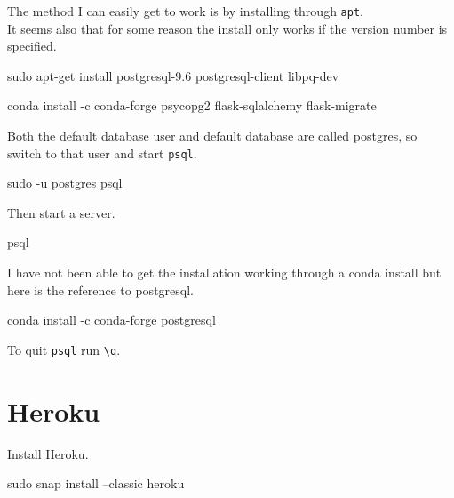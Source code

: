 \documentclass[]{book}
\newenvironment{Shaded}{\begin{snugshade}}{\end{snugshade}}
\newcommand{\FunctionTok}[1]{\textcolor[rgb]{0.00,0.00,0.00}{#1}}
\newcommand{\ExtensionTok}[1]{#1}
\newcommand{\NormalTok}[1]{#1}
\begin{document}
The method I can easily get to work is by installing through
\texttt{apt}.\\
It seems also that for some reason the install only works if the version
number is specified.

\begin{Shaded}
\begin{Highlighting}[]
\FunctionTok{sudo}\NormalTok{ apt-get install postgresql-9.6 postgresql-client libpq-dev}
\end{Highlighting}
\end{Shaded}

conda install -c conda-forge psycopg2 flask-sqlalchemy flask-migrate

Both the default database user and default database are called postgres,
so switch to that user and start \texttt{psql}.

\begin{Shaded}
\begin{Highlighting}[]
\FunctionTok{sudo}\NormalTok{ -u postgres psql}
\end{Highlighting}
\end{Shaded}

Then start a server.

\begin{Shaded}
\begin{Highlighting}[]
\ExtensionTok{psql}
\end{Highlighting}
\end{Shaded}

I have not been able to get the installation working through a conda
install but here is the reference to postgresql.

\begin{Shaded}
\begin{Highlighting}[]
\ExtensionTok{conda}\NormalTok{ install -c conda-forge postgresql}
\end{Highlighting}
\end{Shaded}

To quit \texttt{psql} run \texttt{\textbackslash{}q}.

\section{Heroku}\label{heroku}

Install Heroku.

\begin{Shaded}
\begin{Highlighting}[]
\FunctionTok{sudo}\NormalTok{ snap install --classic heroku}
\end{Highlighting}
\end{Shaded}
\end{document}
